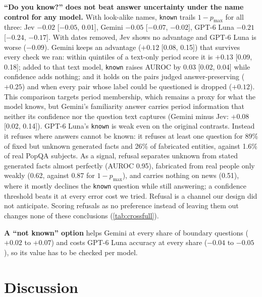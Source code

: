\documentclass[10pt,twocolumn]{article}
\newcommand{\pmax}{p_{\max}}
\begin{document}
\textbf{``Do you know?'' does not beat answer uncertainty under the name
control for any model.} With look-alike names, \texttt{known} trails
$1-\pmax$ for all three: Jev $-0.02$ [$-0.05$, 0.01], Gemini $-0.05$
[$-0.07$, $-0.02$], GPT-6 Luna $-0.21$ [$-0.24$, $-0.17$]. With dates
removed, Jev shows no advantage and GPT-6 Luna is worse ($-0.09$). Gemini
keeps an advantage ($+0.12$ [0.08, 0.15]) that survives every check we ran:
within quintiles of a text-only period score it is $+0.13$ [0.09, 0.18];
added to that text model, \texttt{known} raises AUROC by 0.03 [0.02, 0.04]
while confidence adds nothing; and it holds on the pairs judged
answer-preserving ($+0.25$) and when every pair whose label could be
questioned is dropped ($+0.12$). This comparison targets period membership,
which remains a proxy for what the model knows, but Gemini's familiarity
answer carries period information that neither its confidence nor the
question text captures (Gemini minus Jev: $+0.08$ [0.02, 0.14]). GPT-6 Luna's \texttt{known} is weak even on the
original contrasts. Instead it refuses where answers cannot be known: it
refuses at least one question for 89\% of fixed but unknown generated facts
and 26\% of fabricated entities, against 1.6\% of real PopQA subjects. As a
signal, refusal separates unknown from stated generated facts almost
perfectly (AUROC 0.95), fabricated from real people only weakly (0.62,
against 0.87 for $1-\pmax$), and carries nothing on news (0.51), where it
mostly declines the \texttt{known} question while still answering; a
confidence threshold beats it at every error cost we tried. Refusal is a
channel our design did not anticipate. Scoring refusals as no preference instead of
leaving them out changes none of these conclusions (\cref{tab:crossfull}).

\textbf{A ``not known'' option} helps Gemini at every share of boundary
questions ($+0.02$ to $+0.07$) and costs GPT-6 Luna accuracy at every share
($-0.04$ to $-0.05$), so its value has to be checked per model.

\section{Discussion}
\label{sec:discussion}
\end{document}
